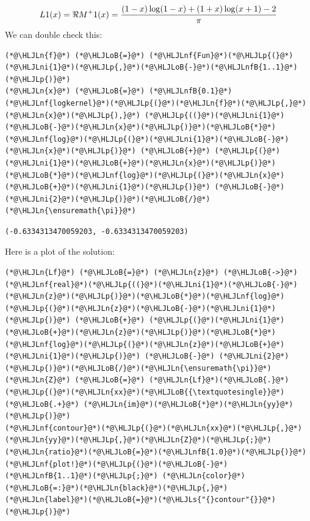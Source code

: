 \documentclass[12pt,landscape]{article}
\newcommand{\HLJLn}[1]{#1}
\newcommand{\HLJLnf}[1]{\textcolor[RGB]{66,102,213}{#1}}
\newcommand{\HLJLs}[1]{\textcolor[RGB]{201,61,57}{#1}}
\newcommand{\HLJLnfB}[1]{\textcolor[RGB]{59,151,46}{#1}}
\newcommand{\HLJLni}[1]{\textcolor[RGB]{59,151,46}{#1}}
\newcommand{\HLJLoB}[1]{\textcolor[RGB]{102,102,102}{\textbf{#1}}}
\newcommand{\HLJLp}[1]{#1}
\begin{document}
{\[
L 1(x) = \Re M^+ 1(x) = {(1-x) \log(1-x) + (1+x)\log(x+1) - 2\over \pi}
\]
We can double check this:


\begin{lstlisting}
(*@\HLJLn{f}@*) (*@\HLJLoB{=}@*) (*@\HLJLnf{Fun}@*)(*@\HLJLp{(}@*)(*@\HLJLni{1}@*)(*@\HLJLp{,}@*)(*@\HLJLoB{-}@*)(*@\HLJLnfB{1..1}@*)(*@\HLJLp{)}@*)
(*@\HLJLn{x}@*) (*@\HLJLoB{=}@*) (*@\HLJLnfB{0.1}@*)
(*@\HLJLnf{logkernel}@*)(*@\HLJLp{(}@*)(*@\HLJLn{f}@*)(*@\HLJLp{,}@*)(*@\HLJLn{x}@*)(*@\HLJLp{),}@*) (*@\HLJLp{((}@*)(*@\HLJLni{1}@*)(*@\HLJLoB{-}@*)(*@\HLJLn{x}@*)(*@\HLJLp{)}@*)(*@\HLJLoB{*}@*)(*@\HLJLnf{log}@*)(*@\HLJLp{(}@*)(*@\HLJLni{1}@*)(*@\HLJLoB{-}@*)(*@\HLJLn{x}@*)(*@\HLJLp{)}@*) (*@\HLJLoB{+}@*) (*@\HLJLp{(}@*)(*@\HLJLni{1}@*)(*@\HLJLoB{+}@*)(*@\HLJLn{x}@*)(*@\HLJLp{)}@*)(*@\HLJLoB{*}@*)(*@\HLJLnf{log}@*)(*@\HLJLp{(}@*)(*@\HLJLn{x}@*)(*@\HLJLoB{+}@*)(*@\HLJLni{1}@*)(*@\HLJLp{)}@*) (*@\HLJLoB{-}@*) (*@\HLJLni{2}@*)(*@\HLJLp{)}@*)(*@\HLJLoB{/}@*)(*@\HLJLn{\ensuremath{\pi}}@*)
\end{lstlisting}

\begin{lstlisting}
(-0.6334313470059203, -0.6334313470059203)
\end{lstlisting}


Here is a plot of the solution:


\begin{lstlisting}
(*@\HLJLn{Lf}@*) (*@\HLJLoB{=}@*) (*@\HLJLn{z}@*) (*@\HLJLoB{->}@*) (*@\HLJLnf{real}@*)(*@\HLJLp{((}@*)(*@\HLJLni{1}@*)(*@\HLJLoB{-}@*)(*@\HLJLn{z}@*)(*@\HLJLp{)}@*)(*@\HLJLoB{*}@*)(*@\HLJLnf{log}@*)(*@\HLJLp{(}@*)(*@\HLJLn{z}@*)(*@\HLJLoB{-}@*)(*@\HLJLni{1}@*)(*@\HLJLp{)}@*) (*@\HLJLoB{+}@*) (*@\HLJLp{(}@*)(*@\HLJLni{1}@*)(*@\HLJLoB{+}@*)(*@\HLJLn{z}@*)(*@\HLJLp{)}@*)(*@\HLJLoB{*}@*)(*@\HLJLnf{log}@*)(*@\HLJLp{(}@*)(*@\HLJLn{z}@*)(*@\HLJLoB{+}@*)(*@\HLJLni{1}@*)(*@\HLJLp{)}@*) (*@\HLJLoB{-}@*) (*@\HLJLni{2}@*)(*@\HLJLp{)}@*)(*@\HLJLoB{/}@*)(*@\HLJLn{\ensuremath{\pi}}@*)
(*@\HLJLn{Z}@*) (*@\HLJLoB{=}@*) (*@\HLJLn{Lf}@*)(*@\HLJLoB{.}@*)(*@\HLJLp{(}@*)(*@\HLJLn{xx}@*)(*@\HLJLoB{{\textquotesingle}}@*) (*@\HLJLoB{.+}@*) (*@\HLJLn{im}@*)(*@\HLJLoB{*}@*)(*@\HLJLn{yy}@*)(*@\HLJLp{)}@*)
(*@\HLJLnf{contour}@*)(*@\HLJLp{(}@*)(*@\HLJLn{xx}@*)(*@\HLJLp{,}@*)(*@\HLJLn{yy}@*)(*@\HLJLp{,}@*)(*@\HLJLn{Z}@*)(*@\HLJLp{;}@*)(*@\HLJLn{ratio}@*)(*@\HLJLoB{=}@*)(*@\HLJLnfB{1.0}@*)(*@\HLJLp{)}@*)
(*@\HLJLnf{plot!}@*)(*@\HLJLp{(}@*)(*@\HLJLoB{-}@*)(*@\HLJLnfB{1..1}@*)(*@\HLJLp{;}@*) (*@\HLJLn{color}@*)(*@\HLJLoB{=:}@*)(*@\HLJLn{black}@*)(*@\HLJLp{,}@*) (*@\HLJLn{label}@*)(*@\HLJLoB{=}@*)(*@\HLJLs{"{}contour"{}}@*)(*@\HLJLp{)}@*)
\end{lstlisting}

}
\end{document}
